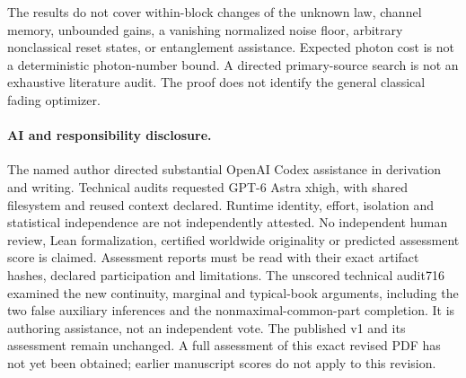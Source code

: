 \documentclass[11pt]{article}
\begin{document}
The results do not cover within-block changes of the unknown law,
channel memory, unbounded gains, a vanishing normalized noise floor,
arbitrary nonclassical reset states, or entanglement assistance.
Expected photon cost is not a deterministic photon-number bound.
A directed primary-source search is not an exhaustive literature audit.
The proof does not identify the general classical fading optimizer.

\paragraph{AI and responsibility disclosure.}
The named author directed substantial OpenAI Codex assistance in
derivation and writing. Technical audits requested GPT-6 Astra xhigh,
with shared filesystem and reused context declared.
Runtime identity, effort, isolation and statistical independence are
not independently attested. No independent human review, Lean
formalization, certified worldwide originality or predicted assessment
score is claimed. Assessment reports must be read with their exact
artifact hashes, declared participation and limitations. The unscored technical audit716 examined the new continuity, marginal
and typical-book arguments, including the two false auxiliary inferences
and the nonmaximal-common-part completion. It is authoring assistance,
not an independent vote. The published v1 and its assessment remain
unchanged. A full assessment of this exact revised PDF has not yet been
obtained; earlier manuscript scores do not apply to this revision.
\end{document}
